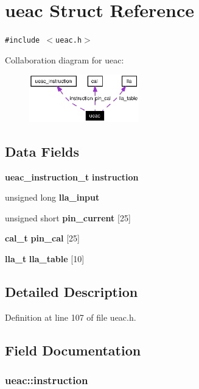 \section{ueac Struct Reference}
\label{structueac}
{\tt \#include $<$ueac.h$>$}

Collaboration diagram for ueac:\begin{figure}[H]
\begin{center}
\leavevmode
\includegraphics[width=135pt]{structueac__coll__graph}
\end{center}
\end{figure}
\subsection*{Data Fields}
\begin{CompactItemize}
\item 
{\bf ueac\_\-instruction\_\-t} {\bf instruction}
\item 
unsigned long {\bf lla\_\-input}
\item 
unsigned short {\bf pin\_\-current} [25]
\item 
{\bf cal\_\-t} {\bf pin\_\-cal} [25]
\item 
{\bf lla\_\-t} {\bf lla\_\-table} [10]
\end{CompactItemize}


\subsection{Detailed Description}




Definition at line 107 of file ueac.h.

\subsection{Field Documentation}
\subsubsection{ {\bf ueac::instruction}}\label{structueac_o0}




